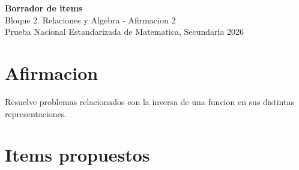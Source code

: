 \documentclass[12pt]{article}
\begin{document}
\begin{center}
  {\Large \textbf{Borrador de items}}\\
  {\large Bloque 2. Relaciones y Algebra - Afirmacion 2}\\[4pt]
  Prueba Nacional Estandarizada de Matematica, Secundaria 2026
\end{center}

\section*{Afirmacion}
Resuelve problemas relacionados con la inversa de una funcion en sus distintas representaciones.

\section*{Items propuestos}
\end{document}
